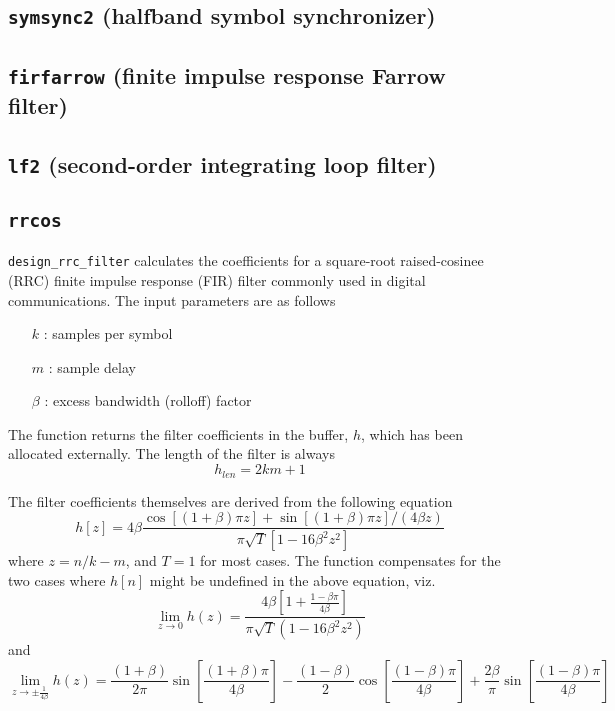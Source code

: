 \subsection{{\tt symsync2} (halfband symbol synchronizer)}

\subsection{{\tt firfarrow} (finite impulse response Farrow filter)}

\subsection{{\tt lf2} (second-order integrating loop filter)}

\subsection{{\tt rrcos}}
{\tt design\_rrc\_filter} calculates the coefficients for a square-root
raised-cosinee (RRC) finite impulse response (FIR) filter commonly used in
digital communications.
The input parameters are as follows
\begin{itemize}
    \item[$k$] : samples per symbol
    \item[$m$] : sample delay
    \item[$\beta$] : excess bandwidth (rolloff) factor
\end{itemize}
The function returns the filter coefficients in the buffer, $h$, which has been
allocated externally.  The length of the filter is always
\[
    h_{len} = 2 k m + 1
\]

The filter coefficients themselves are derived from the following equation
\[ 
    h\left[z\right] =
      4\beta \frac{ \cos\left[(1+\beta)\pi z\right] +
                    \sin\left[(1+\beta)\pi z\right] / (4\beta z) }
                  { \pi \sqrt{T}\left[ 1-16\beta^2z^2\right] }
\]
where $z=n/k-m$, and $T=1$ for most cases.
The function compensates for the two cases where $h[n]$ might be
undefined in the above equation, viz.
\[
    \mathop {\lim }\limits_{z \to 0 } h(z) =
      \frac{ 4\beta \left[ 1 + \frac{1-\beta\pi }{ 4\beta } \right] }
           { \pi\sqrt{T}\left( 1-16\beta^2 z^2 \right) }
\]
and
\[
    \mathop {\lim }\limits_{z \to \pm \frac{1}{4\beta} } h(z) =
        \frac{(1+\beta)}{2\pi}\sin\left[\frac{(1+\beta)\pi}{4\beta}\right]
      - \frac{(1-\beta)}{2}\cos\left[\frac{(1-\beta)\pi}{4\beta}\right]
      + \frac{2\beta}{\pi}\sin\left[\frac{(1-\beta)\pi}{4\beta}\right]
\]

